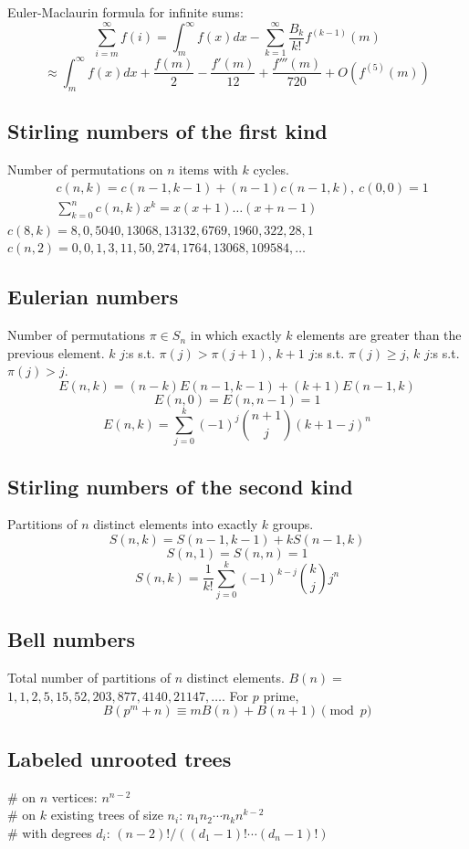 		Euler-Maclaurin formula for infinite sums:
		\small
		\[ \sum_{i=m}^{\infty} f(i) = \int_m^\infty f(x) dx - \sum_{k=1}^\infty \frac{B_k}{k!}f^{(k-1)}(m) \]
		\[ \approx \int_{m}^\infty f(x)dx + \frac{f(m)}{2} - \frac{f'(m)}{12} + \frac{f'''(m)}{720} + O(f^{(5)}(m)) \]
		\normalsize

	\subsection{Stirling numbers of the first kind}
		Number of permutations on $n$ items with $k$ cycles.
		\begin{align*}
			&c(n,k) = c(n-1,k-1) + (n-1) c(n-1,k),\ c(0,0) = 1 \\
			&\textstyle \sum_{k=0}^n c(n,k)x^k = x(x+1) \dots (x+n-1)
		\end{align*}
		$c(8,k) = 8, 0, 5040, 13068, 13132, 6769, 1960, 322, 28, 1$ \\
		$c(n,2) = 0, 0, 1, 3, 11, 50, 274, 1764, 13068, 109584, \dots$

	\subsection{Eulerian numbers}
		Number of permutations $\pi \in S_n$ in which exactly $k$ elements are greater than the previous element. $k$ $j$:s s.t. $\pi(j)>\pi(j+1)$, $k+1$ $j$:s s.t. $\pi(j)\geq j$, $k$ $j$:s s.t. $\pi(j)>j$.
		$$E(n,k) = (n-k)E(n-1,k-1) + (k+1)E(n-1,k)$$
		$$E(n,0) = E(n,n-1) = 1$$
		$$E(n,k) = \sum_{j=0}^k(-1)^j\binom{n+1}{j}(k+1-j)^n$$

	\subsection{Stirling numbers of the second kind}
		Partitions of $n$ distinct elements into exactly $k$ groups.
		$$S(n,k) = S(n-1,k-1) + k S(n-1,k)$$
		$$S(n,1) = S(n,n) = 1$$
		$$S(n,k) = \frac{1}{k!}\sum_{j=0}^k (-1)^{k-j}\binom{k}{j}j^n$$

	\subsection{Bell numbers}
		Total number of partitions of $n$ distinct elements. $B(n) =$
		$1, 1, 2, 5, 15, 52, 203, 877, 4140, 21147, \dots$. For $p$ prime,
		\[ B(p^m+n)\equiv mB(n)+B(n+1) \pmod{p} \]

	\subsection{Labeled unrooted trees}
		\# on $n$ vertices: $n^{n-2}$ \\
		\# on $k$ existing trees of size $n_i$: $n_1n_2\cdots n_k n^{k-2}$ \\
		\# with degrees $d_i$: $(n-2)! / ((d_1-1)! \cdots (d_n-1)!)$

